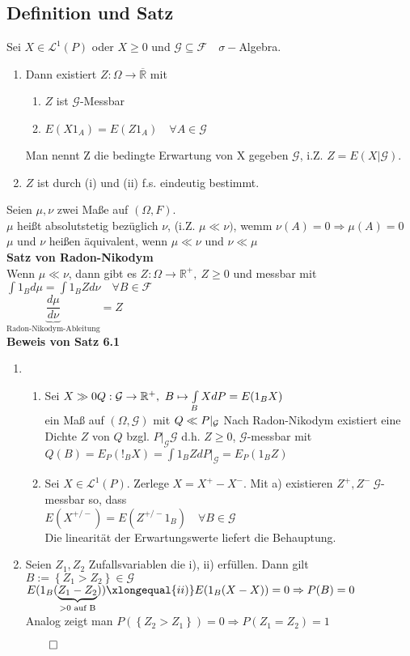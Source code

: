 \documentclass[german,10pt,oneside, fleqn, a4paper]{article}
\newcommand {\R}	{\mathbb{R}}
\newcommand{\Ra}	{\Rightarrow}
\newcommand{\ra}{\rightarrow}
\newcommand{\brac}[1]{\left\lbrace #1\right\rbrace}
\newcommand{\QED}{\begin{flushright}$\qed$\end{flushright}}
\newcommand{\mc}[1]{\mathcal{#1}}
\newcommand{\lp}[1]{\mc{L}^{#1}}
\newcommand{\1}[1]{1_{#1}}
\newcommand{\2}[1]{\1{\brac{#1}}}
\newcommand{\g}{\mc{G}}
\newcommand{\f}{\mc{F}}
\begin{document}
\subsection{Definition und Satz}
\label{6.1}
Sei $X\in\lp{1}(P)$ oder $X\geq0$ und $\g\subseteq\f\quad\sigma-$Algebra.\begin{enumerate}[label=(\alph*)]
\item Dann existiert $Z:\Omega\ra\overline{\R}$ mit \begin{enumerate}[label=(\roman*)]
\item $Z$ ist $\g$-Messbar
\item $E(X1_A)=E(Z1_A)\quad\forall A\in\g$
\end{enumerate}
Man nennt Z die bedingte Erwartung von X gegeben $\g$, i.Z. $Z=E(X|\g)$.
\item $Z$ ist durch (i) und (ii) f.s. eindeutig bestimmt.
\end{enumerate}
Seien $\mu,\nu$ zwei Maße auf $(\Omega,F)$.\\
$\mu$ heißt absolutstetig bezüglich $\nu$, (i.Z. $\mu\ll\nu)$, wemm $\nu(A)=0\Ra\mu(A)=0$\\
$\mu$ und $\nu$ heißen äquivalent, wenn $\mu\ll\nu$ und $\nu\ll\mu$
\\

\textbf{Satz von Radon-Nikodym}\\
\label{Radon}
Wenn $\mu\ll\nu$, dann gibt es $Z:\Omega\ra\R^+,\ Z\geq0$ und messbar mit $\int1_Bd\mu=\int1_BZd\nu\quad\forall B\in\f$\\
\grqq$\underbrace{\dfrac{d\mu}{d\nu}}_{\text{Radon-Nikodym-Ableitung}}$\grqq$=Z$
\\
\textbf{Beweis von Satz 6.1}
\begin{enumerate}[label=(\alph*)]
\item \begin{enumerate}[label=(\roman*)]
\item Sei $X\gg0\\
Q:\g\ra\R^+,\ B\mapsto\int\limits_BXdP=E(1_BX)$\\
ein Maß auf $(\Omega,\g)$ mit $Q\ll P|_{\g}\\ $
Nach Radon-Nikodym existiert eine Dichte $Z$ von $Q$ bzgl. $P|_{\g} \g$ d.h. $Z\geq 0$, $\g$-messbar mit \\
$Q(B)=E_P(!_BX)=\int 1_BZdP|_{\g}=E_P(1_BZ)$
\item Sei $X\in\lp{1}(P)$. Zerlege $X=X^+-X^-$. Mit a) existieren $Z^+,Z^-\ \g$-messbar so, dass\\
$E(X^{+/-})=E(Z^{+/-}1_B)\quad\forall B\in\g$\\
Die linearität der Erwartungswerte liefert die Behauptung.
\end{enumerate}
\item Seien $Z_1,Z_2$ Zufallsvariablen die i), ii) erfüllen. Dann gilt\\
$B:=\brac{Z_1>Z_2}\in\g$\\
$E(1_B(\underbrace{Z_1-Z_2}_{>0\text{ auf B}}))\xlongequal{ii)}E(1_B(X-X))=0\\
\Ra P(B)=0$\\
Analog zeigt man $P(\brac{Z_2>Z_1})=0\Ra P(Z_1=Z_2)=1$\QED
\end{enumerate}
\end{document}
